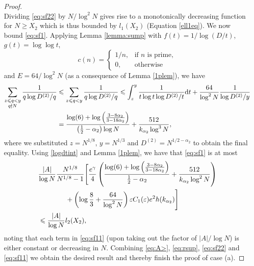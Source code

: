 \documentclass[12pt]{amsart}
\begin{document}
\begin{proof}
\begin{equation}
\end{equation}
Dividing \eqref{eq:sf22} by $N/\log^2N$ gives rise to a monotonically decreasing function for $N\ge X_2$ which is thus bounded by $l_1(X_2)$ (Equation \eqref{ell1eq}). We now bound \eqref{eq:sf1}. Applying Lemma \ref{lemma:sump} with $f(t)=1/\log(D/t)$, $g(t)=\log\log t$, 
\begin{equation*}
    c(n)=
    \begin{cases}
        1/n,&\text{if $n$ is prime},\\
        0,&\text{otherwise}
    \end{cases}
\end{equation*}
and $E=64/\log^2 N$ (as a consequence of Lemma \ref{1plem}), we have
\begin{align}
    \sum_{\substack{z \le q < y\\q\nmid N}}\frac{1}{q\log D^{(2)}/q}&\le \sum_{z \le q < y}\frac{1}{q\log D^{(2)}/q}\le\int_z^y\frac{1}{t\log t \log D^{(2)}/t}\mathrm{d}t+\frac{64}{\log^2N}\frac{1}{\log D^{(2)}/y}\notag\\
    & = \frac{\log(6)+\log\left(\frac{3-8\alpha_2}{3-18\alpha_2}\right)}{\left(\frac{1}{2}-\alpha_2\right) \log N}+\frac{512}{k_{\alpha_2}\log^3N},\label{logdtint}
\end{align}
where we substituted $z=N^{1/8}$, $y=N^{1/3}$ and $D^{(2)}=N^{1/2-\alpha_2}$ to obtain the final equality. Using \eqref{logdtint} and Lemma \ref{1plem}, we have that \eqref{eq:sf1} is at most
\begin{align}
\label{eq:sf11}
&\frac{\left|A\right|}{\log N}\frac{N^{1/8}}{N^{1/8}-1}\Bigg[\frac{e^{\gamma}}{4} \left( \frac{\log(6)+\log\left(\frac{3-8\alpha_2}{3-18\alpha_2}\right)}{\frac{1}{2}-\alpha_2}+\frac{512}{k_{\alpha_2}\log^2N}\right) \notag\\
&\qquad\qquad+\left(\log \frac{8}{3}+\frac{64}{\log^2N}\right)\varepsilon C_{1}(\varepsilon) e^2 h(k_{\alpha_2}) \Bigg]\\
&\le \frac{|A|}{\log N}l_2(X_2)\label{lx2argument},
\end{align}
noting that each term in \eqref{eq:sf11} (upon taking out the factor of $|A|/\log N$) is either constant or decreasing in $N$. Combining \eqref{eq:A>}, \eqref{eq:rsup}, \eqref{eq:sf22} and \eqref{eq:sf11} we obtain the desired result and thereby finish the proof of case (a).


\end{proof}
\end{document}
